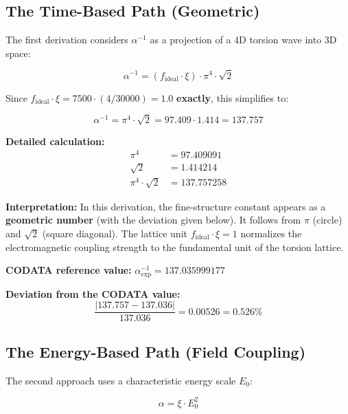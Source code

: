 	\subsection{The Time-Based Path (Geometric)}
	
	The first derivation considers \(\alpha^{-1}\) as a projection of a 4D torsion wave into 3D space:
	
	\begin{equation}
		\boxed{\alpha^{-1} = (f_{\text{ideal}} \cdot \xi) \cdot \pi^4 \cdot \sqrt{2}}
	\end{equation}
	
	Since \(f_{\text{ideal}} \cdot \xi = 7500 \cdot (4/30000) = 1.0\) \textbf{exactly}, this simplifies to:
	
	\begin{equation}
		\alpha^{-1} = \pi^4 \cdot \sqrt{2} = 97.409 \cdot 1.414 = 137.757
	\end{equation}
	
	\textbf{Detailed calculation:}
	\begin{align}
		\pi^4 &= 97.409091 \\
		\sqrt{2} &= 1.414214 \\
		\pi^4 \cdot \sqrt{2} &= 137.757258
	\end{align}
	
	\textbf{Interpretation:} In this derivation, the fine-structure constant appears as a \textbf{geometric number} (with the deviation given below). It follows from \(\pi\) (circle) and \(\sqrt{2}\) (square diagonal). The lattice unit \(f_{\text{ideal}} \cdot \xi = 1\) normalizes the electromagnetic coupling strength to the fundamental unit of the torsion lattice.
	
	\textbf{CODATA reference value:} \(\alpha^{-1}_{\exp} = 137.035999177\)
	
	\textbf{Deviation from the CODATA value:}
	\begin{equation}
		\frac{|137.757 - 137.036|}{137.036} = 0.00526 = 0.526\%
	\end{equation}
	
	\subsection{The Energy-Based Path (Field Coupling)}
	
	The second approach uses a characteristic energy scale \(E_0\):
	
	\begin{equation}
		\boxed{\alpha = \xi \cdot E_0^2}
	\end{equation}
	
